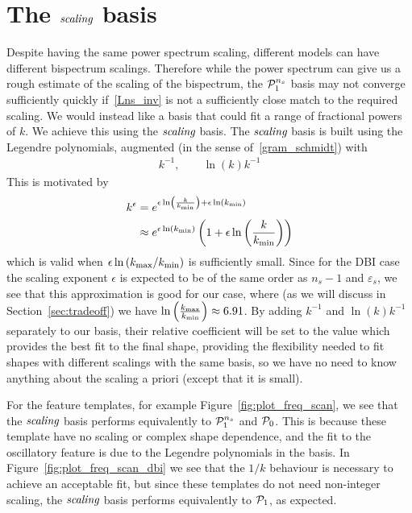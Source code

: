 \section{The $\textit{scaling}$ basis}\label{sec:scaling_definition}
    Despite having the same power spectrum scaling,
    different models can have different bispectrum scalings.
    Therefore while the power spectrum can give us a
    rough estimate of the scaling of the bispectrum,
    the $\mathcal{P}^{n_s}_1$ basis may not converge sufficiently quickly if~\eqref{Lns_inv}
    is not a sufficiently close match to the required scaling.
    We would instead like a basis that could fit
    a range of fractional powers of $k$.
    We achieve this using the $\textit{scaling}$ basis.
    The $\textit{scaling}$ basis is built using the Legendre polynomials,
    augmented (in the sense of~\eqref{gram_schmidt})
    with
    \begin{align}\label{scaling_basis_definition}
        k^{-1},\qquad \ln(k)k^{-1}
    \end{align}
    This is motivated by
    \begin{align}
        k^\epsilon &= e^{\epsilon\ln\left(\frac{k}{{k_\text{min}}}\right)+\epsilon\ln({k_\text{min}})}\\
                   &\approx e^{\epsilon\ln\left({k_\text{min}}\right)}
                      \left(1+\epsilon\ln\left(\frac{k}{{k_\text{min}}}\right)\right)
    \end{align}
    which is valid when $\epsilon\ln\left({k_\text{max}}/{k_\text{min}}\right)$ is
    sufficiently small.
    Since for the DBI case the scaling exponent $\epsilon$ is expected to be of the
    same order as $n_s-1$ and $\varepsilon_s$, we see that this
    approximation is good for our case,
    where (as we will discuss in Section~\ref{sec:tradeoff})
    we have $\ln\left(\frac{{k_\text{max}}}{{k_\text{min}}}\right)\approx6.91$.
    By adding $k^{-1}$ and $\ln(k)k^{-1}$ separately to our
    basis, their relative coefficient will be set to the value
    which provides the best fit to the final shape,
    providing the flexibility needed to fit shapes with different
    scalings with the same basis, so we have no need to know anything
    about the scaling a priori (except that it is small).


    For the feature templates, for example Figure~\ref{fig:plot_freq_scan},
    we see that the $\textit{scaling}$ basis performs equivalently to $\mathcal{P}^{n_s}_1$
    and $\mathcal{P}_0$.
    This is because these template have no scaling or complex shape dependence,
    and the fit to the oscillatory feature is due to the Legendre polynomials
    in the basis.
    In Figure~\ref{fig:plot_freq_scan_dbi} we see that the $1/k$ behaviour is
    necessary to achieve an acceptable fit, but since these templates
    do not need non-integer scaling, the $\textit{scaling}$ basis performs
    equivalently to $\mathcal{P}_1$, as expected.


